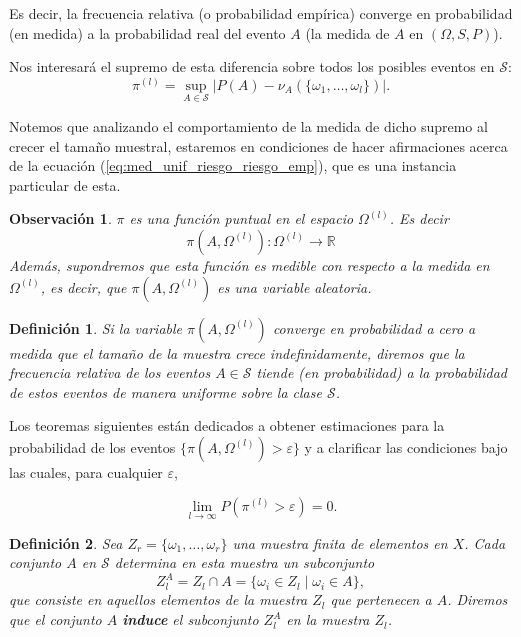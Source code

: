 \documentclass{report}
\newtheorem{dfn}{Definición}[section]
\newtheorem{obs}{Observación}[section]
\begin{document}
Es decir, la frecuencia relativa (o probabilidad empírica) converge en probabilidad (en medida) a la probabilidad real del evento $A$ (la medida de $A$ en $(\Omega, S, P)$).\newline

Nos interesará el supremo de esta diferencia sobre todos los posibles eventos en $\mathcal{S}$:
\begin{equation}
    \pi^{(l)} = \sup_{A\in\mathcal{S}} |P(A)-\nu_A(\{\omega_1,\dots, \omega_l\})|. \label{def: funcion pi}
\end{equation}

Notemos que analizando el comportamiento de la medida de dicho supremo al crecer el tamaño muestral, 
estaremos en condiciones de hacer afirmaciones acerca de la ecuación (\ref{eq:med_unif_riesgo_riesgo_emp}),
que es una instancia particular de esta.\newline

\begin{obs}
$\pi$ es una función puntual en el espacio \( \Omega^{(l)} \). Es decir
\[ \pi(A, \Omega^{(l)}): \Omega^{(l)} \rightarrow \mathbb{R}
\]
Además, supondremos que esta función es medible con respecto a la medida en \( \Omega^{(l)} \), 
es decir, que \( \pi(A, \Omega^{(l)}) \) es una variable aleatoria.
\end{obs} 
\begin{dfn}
Si la variable \( \pi(A, \Omega^{(l)}) \) converge en probabilidad a cero a medida que 
el tamaño de la muestra crece indefinidamente, diremos que la frecuencia relativa 
de los eventos \( A \in \mathcal{S} \) tiende (en probabilidad) a la probabilidad 
de estos eventos de manera \emph{uniforme} sobre la clase \( \mathcal{S} \).
\end{dfn}


Los teoremas siguientes están dedicados a obtener estimaciones para la probabilidad 
de los eventos \( \{ \pi(A, \Omega^{(l)}) > \varepsilon \} \) y a clarificar las condiciones 
bajo las cuales, para cualquier \( \varepsilon \),

\[
\lim_{l \to \infty} P\left(\pi^{(l)} > \varepsilon\right) = 0.
\]
\bigskip


\begin{dfn}
Sea \( Z_r = \{\omega_1, \dots, \omega_r\} \) una muestra finita de elementos en \( X \). 
Cada conjunto \( A \) en \( \mathcal{S} \) determina en esta muestra un subconjunto 
\[ 
    Z_l^A = Z_l \cap A = \{\omega_i \in Z_l \mid \omega_i \in A\}, 
\]
que consiste en aquellos elementos de la 
muestra \( Z_l \) que pertenecen a \( A \). Diremos que el conjunto \( A \) \textbf{induce} 
el subconjunto \( Z_l^A  \) en la muestra \( Z_l \).
\end{dfn}
\bigskip
\end{document}

